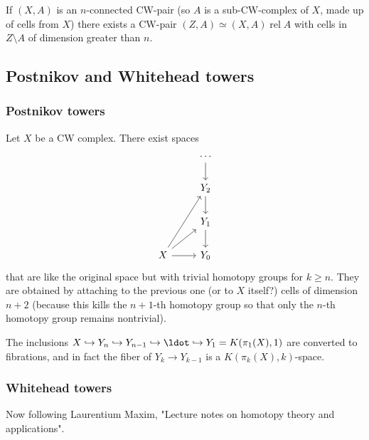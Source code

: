 \begin{remark}
\begin{thm}[CW approximation]
	If $(X,A)$ is an $n$-connected CW-pair (so $A$ is a sub-CW-complex of $X$, made up of cells from $X$) there exists a CW-pair $(Z,A)\simeq (X,A)\operatorname{rel}A$ with cells in $Z\setminus A$ of dimension greater than $n$.
\end{thm}

\subsection{Postnikov and Whitehead towers}

\subsubsection{Postnikov towers}
Let $X$ be a CW complex. There exist spaces
\[\begin{tikzcd}
	&\cdots\arrow[d]\\
	&Y_{2}\arrow[d]\\
	&Y_{1}\arrow[d]\\
	X\arrow[uur]\arrow[ur]\arrow[r]&Y_{0}
\end{tikzcd}\]
that are like the original space but with trivial homotopy groups for $k\geq n$. They are obtained by attaching to the previous one {\color{blue}(or to $X$ itself?)} cells of dimension $n+2$ (because this kills the $n+1$-th homotopy group so that only the $n$-th homotopy group remains nontrivial).

The inclusions $X\hookrightarrow Y_{n}\hookrightarrow Y_{n-1}\hookrightarrow \ldot\hookrightarrow Y_{1}=K(\pi_{1}(X),1)$ are converted to fibrations, and in fact the fiber of $Y_{k}\to Y_{k-1}$ is a $K(\pi_{k}(X),k)$-space.

\subsubsection{Whitehead towers}

Now following Laurentium Maxim, "Lecture notes on homotopy theory and applications".


\end{remark}
